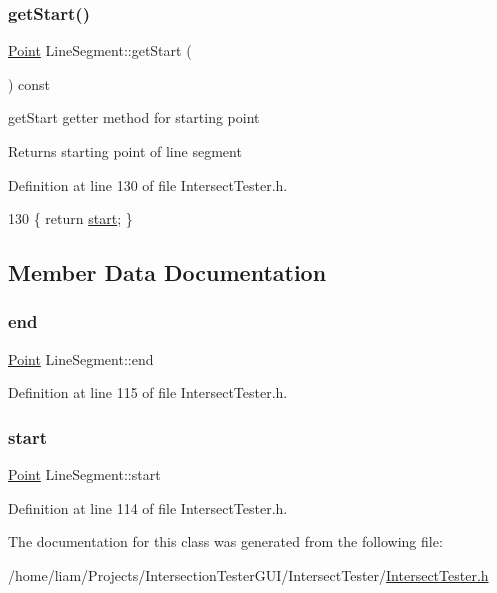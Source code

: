 \subsubsection{\texorpdfstring{get\+Start()}{getStart()}}
{\footnotesize\ttfamily \hyperlink{class_point}{Point} Line\+Segment\+::get\+Start (\begin{DoxyParamCaption}{ }\end{DoxyParamCaption}) const\hspace{0.3cm}{\ttfamily [inline]}}



get\+Start getter method for starting point 

\begin{DoxyReturn}{Returns}
starting point of line segment 
\end{DoxyReturn}


Definition at line 130 of file Intersect\+Tester.\+h.


\begin{DoxyCode}
130 \{ \textcolor{keywordflow}{return} \hyperlink{class_line_segment_a91bddd96ae050a8255e3180c50f071f5}{start}; \}
\end{DoxyCode}


\subsection{Member Data Documentation}
\mbox{\label{class_line_segment_acf33c308064ab9c60f47c11b5d23db06}} 
\subsubsection{\texorpdfstring{end}{end}}
{\footnotesize\ttfamily \hyperlink{class_point}{Point} Line\+Segment\+::end}



Definition at line 115 of file Intersect\+Tester.\+h.

\mbox{\label{class_line_segment_a91bddd96ae050a8255e3180c50f071f5}} 
\subsubsection{\texorpdfstring{start}{start}}
{\footnotesize\ttfamily \hyperlink{class_point}{Point} Line\+Segment\+::start}



Definition at line 114 of file Intersect\+Tester.\+h.



The documentation for this class was generated from the following file\+:\begin{DoxyCompactItemize}
\item 
/home/liam/\+Projects/\+Intersection\+Tester\+G\+U\+I/\+Intersect\+Tester/\hyperlink{_intersect_tester_8h}{Intersect\+Tester.\+h}\end{DoxyCompactItemize}
